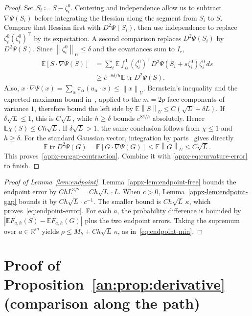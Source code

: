 \documentclass[11pt,letterpaper]{article}
\theoremstyle{remark}
\newcommand{\E}{\mathbb E}
\newcommand{\R}{\mathbb R}
\newcommand{\tr}{\operatorname{tr}}
\newcommand{\norm}[1]{\left\lVert#1\right\rVert}
\newcommand{\dd}{\,d}
\begin{document}
\begin{proof}
Set \(S_i\coloneqq S-\zeta_i^0\). Centering and independence
allow us to subtract \(\nabla\Psi(S_i)\) before integrating the
Hessian along the segment from \(S_i\) to \(S\).
Compare that Hessian first with \(D^2\Psi(S_i)\), then use
independence to replace \(\zeta_i^0(\zeta_i^0)^\top\) by its
expectation. A second comparison replaces \(D^2\Psi(S_i)\) by
\(D^2\Psi(S)\). Since \(\norm{\zeta_i^0}_U\le\delta\) and
the covariances sum to \(I_r\),
\[
 \begin{split}
 \E[S\cdot\nabla\Psi(S)]
 &=\sum_i\E\int_0^1
 (\zeta_i^0)^\top D^2\Psi(S_i+s\zeta_i^0)\zeta_i^0\dd s\\
 &\ge e^{-8\delta/h}\E\tr D^2\Psi(S).
 \end{split}
\]
Also, \(x\cdot\nabla\Psi(x)=\sum_\alpha\pi_\alpha(u_\alpha\cdot x)
\le\norm x_U\). Bernstein's inequality and the expected-maximum bound
in~\cite[Chapter~2]{BLM2013}, applied to the \(m=2p\) face
components of variance \(1\), therefore bound the left side by
\(\E\norm S_U\le C(\sqrt L+\delta L)\).
If \(\delta\sqrt L\le1\), this is \(C\sqrt L\), while
\(h\ge\delta\) bounds \(e^{8\delta/h}\) absolutely. Hence
\(\E\chi(S)\le Ch\sqrt L\). If \(\delta\sqrt L>1\), the
same conclusion follows from \(\chi\le1\) and \(h\ge\delta\).
For the standard Gaussian vector, integration by parts~\cite{Stein1981}
gives directly
\[
 \E\tr D^2\Psi(G)=\E[G\cdot\nabla\Psi(G)]
 \le\E\norm G_U\le C\sqrt L.
\]
This proves~\eqref{appx-eq:gap-contraction}. Combine it with
\eqref{appx-eq:curvature-error} to finish.
\end{proof}

\begin{proof}[Proof of Lemma~\ref{lem:endpoint}]
Lemma~\ref{appx-lem:endpoint-free} bounds the endpoint error by
\(ChL^{3/2}=Ch\sqrt L\cdot L\). When \(c>0\),
Lemma~\ref{appx-lem:endpoint-gap} bounds it by
\(Ch\sqrt L\cdot c^{-1}\). The smaller bound is
\(Ch\sqrt L\,\kappa\), which proves~\eqref{eq:endpoint-error}.
For each \(a\), the probability difference is bounded by
\(|\E F_{a,h}(S)-\E F_{a,h}(G)|\) plus the two endpoint errors.
Taking the supremum over \(a\in\R^m\) yields
\(\rho\le M_h+Ch\sqrt L\,\kappa\), as in~\eqref{eq:endpoint-min}.
\end{proof}

\section{Proof of Proposition~\ref*{an:prop:derivative} (comparison along the path)}
\label{appx-sec:support}
\end{document}
